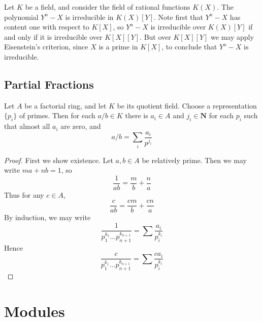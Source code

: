 \begin{example}
    Let $K$ be a field, and consider the field of rational functions $K(X)$. The polynomial $Y^n - X$ is irreducible in $K(X)[Y]$. Note first that $Y^n - X$ has content one with respect to $K[X]$, so $Y^n - X$ is irreducible over $K(X)[Y]$ if and only if it is irreducible over $K[X][Y]$. But over $K[X][Y]$ we may apply Eisenstein's criterion, since $X$ is a prime in $K[X]$, to conclude that $Y^n - X$ is irreducible.
\end{example}


\section{Partial Fractions}

\begin{theorem}
    Let $A$ be a factorial ring, and let $K$ be its quotient field. Choose a representation $\{ p_i \}$ of primes. Then for each $a/b \in K$ there is $a_i \in A$ and $j_i \in \mathbf{N}$ for each $p_i$ such that almost all $a_i$ are zero, and
    \[ a/b = \sum_i \frac{a_i}{p^{j_i}} \]
\end{theorem}
\begin{proof}
    First we show existence. Let $a,b \in A$ be relatively prime. Then we may write $ma + nb = 1$, so
    \[ \frac{1}{ab} = \frac{m}{b} + \frac{n}{a} \]
    Thus for any $c \in A$,
    \[ \frac{c}{ab} = \frac{cm}{b} + \frac{cn}{a} \]
    By induction, we may write
    \[  \frac{1}{p_1^{k_1} \dots p_{n+1}^{k_{n+1}}} = \sum \frac{a_i}{p_i^{k_i}} \]
    Hence
    \[ \frac{c}{p_1^{k_1} \dots p_{n+1}^{k_{n+1}}} = \sum \frac{c a_i}{p_i^{k_i}} \]
\end{proof}













\chapter{Modules}

